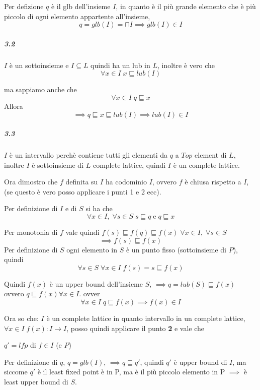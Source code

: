 \documentclass{article}
\begin{document}
Per defizione $q$ è il glb dell'insieme $I$, in quanto è il più grande elemento che è più piccolo di ogni elemento appartente all'insieme, $$q=glb(I)= \sqcap I \implies glb(I) \in I$$

\subparagraph{3.2}

$I$ è un sottoinsieme e $I\subseteq L$ quindi ha un lub in $L$, inoltre è vero che $$\forall x \in I \; x \sqsubseteq lub(I)$$ 

ma sappiamo anche che $$\forall x \in I \; q \sqsubseteq x$$ 
Allora
$$\implies q \sqsubseteq x \sqsubseteq lub(I) \implies lub(I) \in I$$

\subparagraph{3.3}

$I$ è un intervallo perchè contiene tutti gli elementi da $q$ a $Top $ element  di $L$, inoltre $I$ è sottoinsieme di $L$ complete lattice, quindi $I$ è un complete lattice.

Ora dimostro che $f$ definita su $I$ ha codominio $I$, ovvero $f$ è chiusa rispetto a $I$, (se questo è vero posso applicare i punti 1 e 2 ecc). 

Per definizione di $I$ e di $S$ si ha che $$ \forall x \in I, \; \forall s \in S \; s \sqsubseteq q\; \text{e}\; q \sqsubseteq x  $$

Per monotonia di $f$ vale quindi $f(s)\sqsubseteq f(q)\sqsubseteq f(x)\; \forall x \in I, \; \forall s \in S  $
$$\implies f(s) \sqsubseteq f(x)$$
Per definizione di $S$ ogni elemento in $S$ è un punto fisso (sottoinsieme di $P$), quindi $$\forall s \in S \; \forall x \in I \; f(s)=s\sqsubseteq f(x)$$

Quindi $f(x)$ è un upper bound dell'insieme $S$, $\implies q=lub(S) \sqsubseteq f(x) $ ovvero $q\sqsubseteq f(x) \forall x \in I$. ovver $$ \forall x \in I \; q \sqsubseteq f(x) \implies f(x) \in I$$

Ora so che: $I$ è un complete lattice in quanto intervallo in un complete lattice, $\forall x \in I \; f(x):I \to I$, posso quindi applicare il punto \textbf{2} e vale che 
\begin{center}
$q'=lfp$ di $f \in I$ (e $P$)
\end{center}

Per definizione di $q$, $q=glb(I)$, $\implies q \sqsubseteq q'$, quindi $q'$ è upper bound di $I$, ma siccome $q'$ è il least fixed point è in P, ma è il più piccolo elemento in P $\implies$ è least upper bound di $S$.
\end{document}

